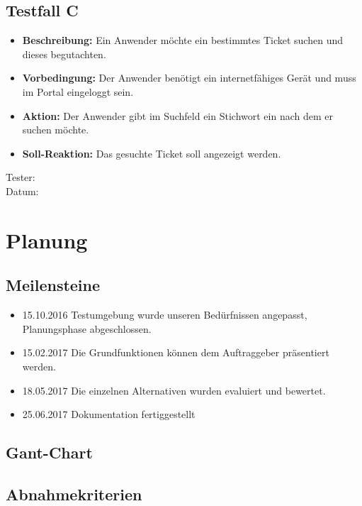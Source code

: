 \subsection{Testfall C}
\begin{itemize}
	\item \textbf{Beschreibung:} Ein Anwender möchte ein bestimmtes Ticket suchen und dieses begutachten. 
	\item \textbf{Vorbedingung:} Der Anwender benötigt ein internetfähiges Gerät und muss im Portal eingeloggt sein.
	\item \textbf{Aktion:} Der Anwender gibt im Suchfeld ein Stichwort ein nach dem er suchen möchte. 
	\item \textbf{Soll-Reaktion:} Das gesuchte Ticket soll angezeigt werden.
\end{itemize}
Tester:
\\
Datum:





\section{Planung}
\subsection{Meilensteine}
\begin{itemize}
	\item 15.10.2016 Testumgebung wurde unseren Bedürfnissen angepasst, Planungsphase abgeschlossen.
	\item 15.02.2017 Die Grundfunktionen können dem Auftraggeber präsentiert werden.
	\item 18.05.2017 Die einzelnen Alternativen wurden evaluiert und bewertet.
	\item 25.06.2017 Dokumentation fertiggestellt
\end{itemize}




\subsection{Gant-Chart}
\subsection{Abnahmekriterien}
